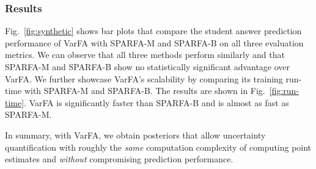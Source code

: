\documentclass{edm_article}
\newcommand{\ml}[1]{\textcolor{orange}{\bf [LAN bandit: #1]}}
\begin{document}
\subsubsection{Results} 
Fig.~\ref{fig:synthetic} shows bar plots that compare the 
student answer prediction performance
of VarFA with SPARFA-M and SPARFA-B on all three evaluation metrics. 
We can observe that all three methods perform similarly and that SPARFA-M and SPARFA-B show no statistically significant advantage over VarFA.
\sloppy
We further showcase VarFA's scalability by comparing its training run-time with SPARFA-M and SPARFA-B. The results are shown in Fig.~\ref{fig:run-time}. VarFA is significantly faster than SPARFA-B and is almost as fast as SPARFA-M. 

In summary, with VarFA, we obtain posteriors that allow uncertainty quantification with roughly the \textit{same} computation complexity of computing point estimates and \textit{without} compromising prediction performance. 
 
\end{document}
